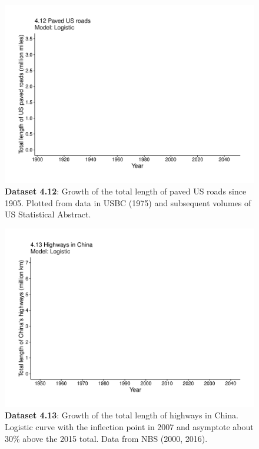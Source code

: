 \documentclass[aps,rmp,preprint,superscriptaddress,10pt,onecolumn]{article}
\begin{document}
\clearpage
\begin{figure}[h]
\includegraphics[width=\textwidth]{output/figs-ggplot/4.12.pdf}
\caption{\textbf{Dataset 4.12}: Growth of the total length of paved US roads since 1905. Plotted from data in USBC (1975) and subsequent volumes of US Statistical Abstract.}
\end{figure}
	
\clearpage
\begin{figure}[h]
\includegraphics[width=\textwidth]{output/figs-ggplot/4.13.pdf}
\caption{\textbf{Dataset 4.13}: Growth of the total length of highways in China. Logistic curve with the inflection point in 2007 and asymptote about 30\% above the 2015 total. Data from NBS (2000, 2016).}
\end{figure}
	
\end{document}

